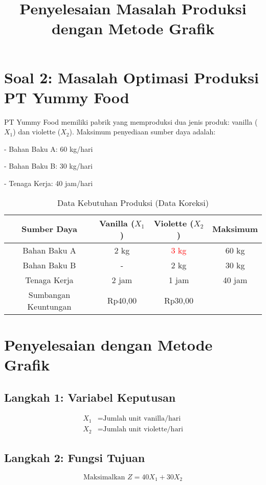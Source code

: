 \documentclass[12pt,a4paper]{article}
\title{Penyelesaian Masalah Produksi dengan Metode Grafik}
\author{}
\date{}
\begin{document}
\maketitle

\section*{Soal 2: Masalah Optimasi Produksi PT Yummy Food}
PT Yummy Food memiliki pabrik yang memproduksi dua jenis produk: vanilla ($X_1$) dan violette ($X_2$). Maksimum penyediaan sumber daya adalah:

    
- Bahan Baku A: 60 kg/hari
    
- Bahan Baku B: 30 kg/hari
    
- Tenaga Kerja: 40 jam/hari


\begin{table}[H]
\centering
\begin{tabular}{|c|c|c|c|}
\hline
\textbf{Sumber Daya} & \textbf{Vanilla} ($X_1$) & \textbf{Violette} ($X_2$) & \textbf{Maksimum} \\
\hline
Bahan Baku A & 2 kg & \textcolor{red}{3 kg} & 60 kg \\
\hline
Bahan Baku B & - & 2 kg & 30 kg \\
\hline
Tenaga Kerja & 2 jam & 1 jam & 40 jam \\
\hline
Sumbangan Keuntungan & Rp40,00 & Rp30,00 & \\
\hline
\end{tabular}
\caption{Data Kebutuhan Produksi (Data Koreksi)}
\end{table}

\section*{Penyelesaian dengan Metode Grafik}

\subsection*{Langkah 1: Variabel Keputusan}
\begin{align*}
X_1 &= \text{Jumlah unit vanilla/hari} \\
X_2 &= \text{Jumlah unit violette/hari}
\end{align*}

\subsection*{Langkah 2: Fungsi Tujuan}
$$
\text{Maksimalkan } Z = 40X_1 + 30X_2
$$
\end{document}
